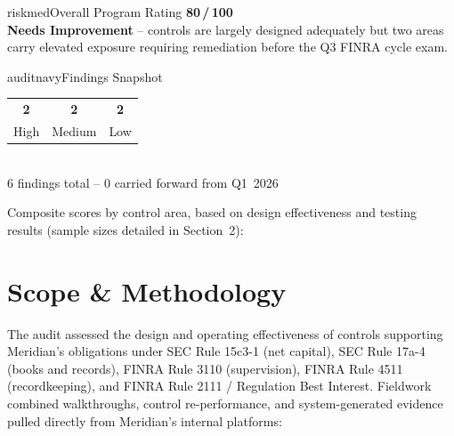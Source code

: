 \documentclass[11pt,a4paper]{scrreprt}
\newcommand{\barrow}[4]{%
  \pgfmathsetmacro{\w}{#2*0.09}
  \node[anchor=east,font=\scriptsize] at (-0.3,#4) {#1};
  \draw[fill=gray!12,draw=none] (0,#4-0.16) rectangle (9,#4+0.16);
  \draw[fill=#3,draw=none] (0,#4-0.16) rectangle (\w,#4+0.16);
  \node[anchor=west,font=\scriptsize\bfseries] at (9.25,#4) {#2\%};
}
\begin{document}
\begin{center}
\begin{minipage}{0.47\linewidth}
\begin{ratingbox}{riskmed}{Overall Program Rating}
\centering
{\Huge\bfseries\color{riskmed} 80\,/\,100}\\[4pt]
{\small\color{auditslate} \textbf{Needs Improvement} -- controls are largely designed
adequately but two areas carry elevated exposure requiring remediation before the Q3
FINRA cycle exam.}
\end{ratingbox}
\end{minipage}\hfill
\begin{minipage}{0.47\linewidth}
\begin{ratingbox}{auditnavy}{Findings Snapshot}
\centering
\begin{tabular}{@{}ccc@{}}
\textcolor{riskhigh}{\Large\bfseries 2} & \textcolor{riskmed}{\Large\bfseries 2} & \textcolor{risklow}{\Large\bfseries 2}\\
{\scriptsize High} & {\scriptsize Medium} & {\scriptsize Low}
\end{tabular}\\[4pt]
{\small\color{auditslate} 6 findings total -- 0 carried forward from Q1~2026}
\end{ratingbox}
\end{minipage}
\end{center}

\vspace{0.3cm}
\noindent Composite scores by control area, based on design effectiveness and testing results
(sample sizes detailed in Section~2):

\begin{center}
\end{center}

\section*{Scope \& Methodology}

The audit assessed the design and operating effectiveness of controls supporting Meridian's
obligations under SEC Rule 15c3-1 (net capital), SEC Rule 17a-4 (books and records), FINRA
Rule 3110 (supervision), FINRA Rule 4511 (recordkeeping), and FINRA Rule 2111 / Regulation
Best Interest. Fieldwork combined walkthroughs, control re-performance, and system-generated
evidence pulled directly from Meridian's internal platforms:
\end{document}

